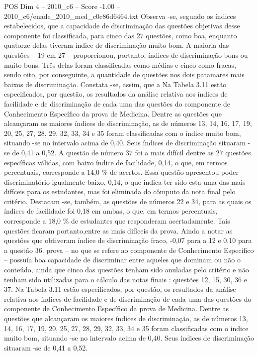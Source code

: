 \begin{textsample}{POS Dim 4 – 2010\_c6 – Score -1.00 – 2010\_c6/enade\_2010\_med\_c0c86d6464.txt}
Observa -se, segundo os índices estabelecidos, que a capacidade de discriminação das questões objetivas desse componente foi classificada, para cinco das 27 questões, como boa, enquanto quatorze delas tiveram índice de discriminação muito bom.
A maioria das questões – 19 em 27 – proporcionou, portanto, índices de discriminação bons ou muito bons.
Três delas foram classificadas como médias e cinco como fracas, sendo oito, por conseguinte, a quantidade de questões nos dois patamares mais baixos de discriminação.
Constata -se, assim, que a Na Tabela 3.11 estão especificados, por questão, os resultados da análise relativa aos índices de facilidade e de discriminação de cada uma das questões do componente de Conhecimento Específico da prova de Medicina.
Dentre as questões que alcançaram os maiores índices de discriminação, as de números 13, 14, 16, 17, 19, 20, 25, 27, 28, 29, 32, 33, 34 e 35 foram classificadas com o índice muito bom, situando -se no intervalo acima de 0,40.
Seus índices de discriminação situaram -se de 0,41 a 0,52.
A questão de número 37 foi a mais difícil dentre as 27 questões específicas válidas, com baixo índice de facilidade, 0,14, o que, em termos percentuais, corresponde a 14,0 \% de acertos.
Essa questão apresentou poder discriminatório igualmente baixo, 0,14, o que indica ter sido esta uma das mais difíceis para os estudantes, mas foi eliminada do cômputo da nota final pelo critério.
Destacam -se, também, as questões de números 22 e 34, para as quais os índices de facilidade foi 0,18 em ambas, o que, em termos percentuais, corresponde a 18,0 \% de estudantes que responderam acertadamente.
Tais questões ficaram portanto,entre as mais difíceis da prova.
Ainda a notar as questões que obtiveram índice de discriminação fraco, -0,07 para a 12 e 0,10 para a questão 36. prova – no que se refere ao componente de Conhecimento Específico – possuía boa capacidade de discriminar entre aqueles que dominam ou não o conteúdo, ainda que cinco das questões tenham sido anuladas pelo critério e não tenham sido utilizadas para o cálculo das notas finais : questões 12, 15, 30, 36 e 37.
Na Tabela 3.11 estão especificados, por questão, os resultados da análise relativa aos índices de facilidade e de discriminação de cada uma das questões do componente de Conhecimento Específico da prova de Medicina.
Dentre as questões que alcançaram os maiores índices de discriminação, as de números 13, 14, 16, 17, 19, 20, 25, 27, 28, 29, 32, 33, 34 e 35 foram classificadas com o índice muito bom, situando -se no intervalo acima de 0,40.
Seus índices de discriminação situaram -se de 0,41 a 0,52.

\end{textsample}
